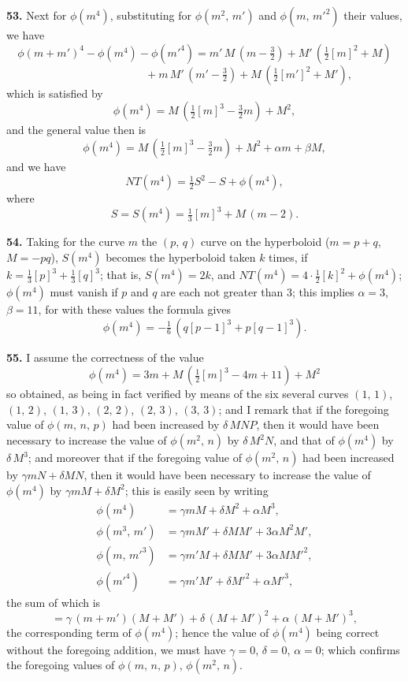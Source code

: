 \documentclass[11pt,a4paper]{article}
\begin{document}
\textbf{53.} Next for $\phi(m^4)$, substituting for $\phi(m^2,\,m')$ and $\phi(m,\,m'^2)$ their values, we have
\[
\phi(m+m')^4 - \phi(m^4) - \phi(m'^4) = m'\,M\,(m - \tfrac{3}{2}) + M'\,(\tfrac{1}{2}[m]^2 + M)
\]
\[
\hspace{8em} + m\,M'\,(m' - \tfrac{3}{2}) + M\,(\tfrac{1}{2}[m']^2 + M'),
\]
which is satisfied by
\[
\phi(m^4) = M\,(\tfrac{1}{2}[m]^3 - \tfrac{3}{2}m) + M^2,
\]
and the general value then is
\[
\phi(m^4) = M\,(\tfrac{1}{2}[m]^3 - \tfrac{3}{2}m) + M^2 + \alpha m + \beta M,
\]
and we have
\[
NT(m^4) = \tfrac{1}{2}S^2 - S + \phi(m^4),
\]
where
\[
S = S(m^4) = \tfrac{1}{3}[m]^3 + M\,(m-2).
\]

\medskip

\textbf{54.} Taking for the curve $m$ the $(p,\,q)$ curve on the hyperboloid ($m = p+q$, $M = -pq$), $S(m^4)$ becomes the hyperboloid taken $k$ times, if $k = \tfrac{1}{3}[p]^3 + \tfrac{1}{3}[q]^3$; that is, $S(m^4) = 2k$, and $NT(m^4) = 4 \cdot \tfrac{1}{2}[k]^2 + \phi(m^4)$; $\phi(m^4)$ must vanish if $p$ and $q$ are each not greater than $3$; this implies $\alpha = 3$, $\beta = 11$, for with these values the formula gives
\[
\phi(m^4) = -\tfrac{1}{6}\,(q[p-1]^3 + p[q-1]^3).
\]

\medskip

\textbf{55.} I assume the correctness of the value
\[
\phi(m^4) = 3m + M\,(\tfrac{1}{2}[m]^3 - 4m + 11) + M^2
\]
so obtained, as being in fact verified by means of the six several curves $(1,\,1)$, $(1,\,2)$, $(1,\,3)$, $(2,\,2)$, $(2,\,3)$, $(3,\,3)$; and I remark that if the foregoing value of $\phi(m,\,n,\,p)$ had been increased by $\delta\,MNP$, then it would have been necessary to increase the value of $\phi(m^2,\,n)$ by $\delta\,M^2 N$, and that of $\phi(m^4)$ by $\delta\,M^3$; and moreover that if the foregoing value of $\phi(m^2,\,n)$ had been increased by $\gamma mN + \delta MN$, then it would have been necessary to increase the value of $\phi(m^4)$ by $\gamma mM + \delta M^2$; this is easily seen by writing
\begin{align*}
\phi(m^4) &= \gamma mM + \delta M^2 + \alpha M^3,\\
\phi(m^3,\,m') &= \gamma m M' + \delta M M' + 3 \alpha M^2 M',\\
\phi(m,\,m'^3) &= \gamma m' M + \delta M M' + 3 \alpha M M'^2,\\
\phi(m'^4) &= \gamma m' M' + \delta M'^2 + \alpha M'^3,
\end{align*}
the sum of which is
\[
= \gamma\,(m + m')(M + M') + \delta\,(M + M')^2 + \alpha\,(M + M')^3,
\]
the corresponding term of $\phi(m^4)$; hence the value of $\phi(m^4)$ being correct without the foregoing addition, we must have $\gamma = 0$, $\delta = 0$, $\alpha = 0$; which confirms the foregoing values of $\phi(m,\,n,\,p)$, $\phi(m^2,\,n)$.
\end{document}
